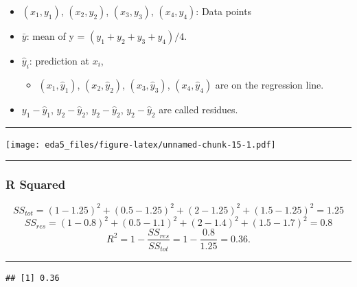 \documentclass[
]{article}
\newenvironment{Shaded}{\begin{snugshade}}{\end{snugshade}}
\newcommand{\FunctionTok}[1]{\textcolor[rgb]{0.00,0.00,0.00}{#1}}
\newcommand{\NormalTok}[1]{#1}
\newcommand{\SpecialCharTok}[1]{\textcolor[rgb]{0.00,0.00,0.00}{#1}}
\providecommand{\tightlist}{%
  \setlength{\itemsep}{0pt}\setlength{\parskip}{0pt}}
\begin{document}
\begin{itemize}
\tightlist
\item
  \((x_1, y_1)\), \((x_2,y_2)\), \((x_3, y_3)\), \((x_4, y_4)\): Data
  points
\item
  \(\bar{y}\): mean of y = \((y_1 + y_2 + y_3 + y_4)/4\).
\item
  \(\hat{y}_i\): prediction at \(x_i\),

  \begin{itemize}
  \tightlist
  \item
    \((x_1, \hat{y}_1)\), \((x_2, \hat{y}_2)\), \((x_3, \hat{y}_3)\),
    \((x_4, \hat{y}_4)\) are on the regression line.
  \end{itemize}
\item
  \(y_1-\hat{y}_1\), \(y_2-\hat{y}_2\), \(y_2-\hat{y}_2\),
  \(y_2-\hat{y}_2\) are called residues.
\end{itemize}

\begin{center}\rule{0.5\linewidth}{0.5pt}\end{center}

\texttt{[image: eda5\_files/figure-latex/unnamed-chunk-15-1.pdf]}

\begin{center}\rule{0.5\linewidth}{0.5pt}\end{center}

\hypertarget{r-squared}{%
\subsubsection{R Squared}\label{r-squared}}

\[SS_{tot} = (1-1.25)^2 + (0.5-1.25)^2 + (2-1.25)^2 + (1.5-1.25)^2 = 1.25\]
\[SS_{res} = (1-0.8)^2 + (0.5-1.1)^2 + (2-1.4)^2 + (1.5-1.7)^2 = 0.8\]
\[R^2 = 1 - \frac{SS_{res}}{SS_{tot}} = 1- \frac{0.8}{1.25} = 0.36.\]

\begin{center}\rule{0.5\linewidth}{0.5pt}\end{center}

\begin{Shaded}
\end{Shaded}

\begin{verbatim}
## [1] 0.36
\end{verbatim}
\end{document}
